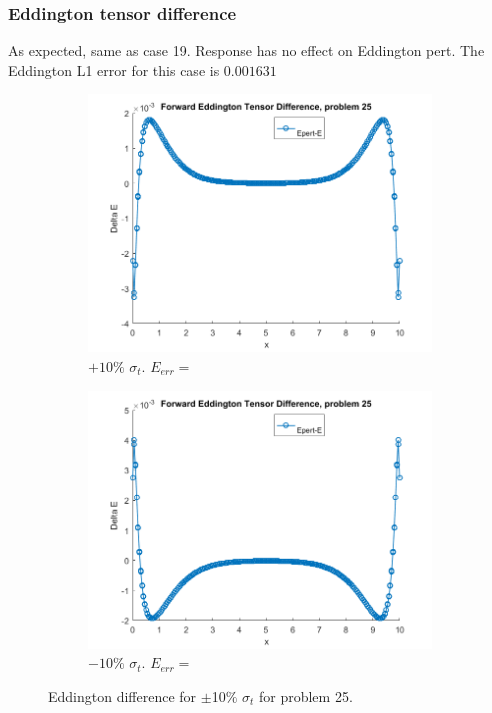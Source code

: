 \documentclass{article}
\begin{document}
\subsubsection{Eddington tensor difference}
As expected, same as case 19. Response has no effect on Eddington pert. The Eddington L1 error for this case is $0.001631$
\begin{figure}[H]
\centering
\begin{subfigure}{.5\textwidth}
  \centering
  \includegraphics[width=1\linewidth]{p25deltaE.png}
  \caption{$+10\%$ $\sigma_t$. $E_{err}=$}
  \label{fig:sub1}
\end{subfigure}%
\begin{subfigure}{.5\textwidth}
  \centering
  \includegraphics[width=1\linewidth]{p25deltaEdst-10.png}
  \caption{$-10\%$ $\sigma_t$. $E_{err}=$}
  \label{fig:sub2}
\end{subfigure}
\caption{Eddington difference for $\pm$10$\%$ $\sigma_t$ for problem 25.}
\label{fig:test}
\end{figure}
\end{document}
